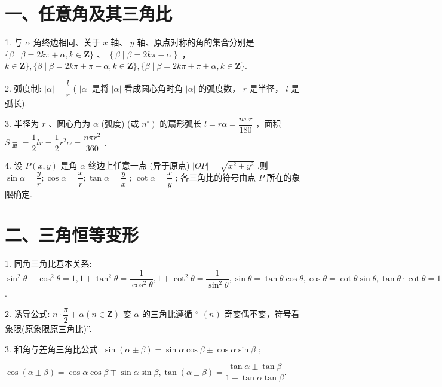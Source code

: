 \section*{一、任意角及其三角比}

1. 与 $\alpha$ 角终边相同、关于 $x$ 轴、 $y$ 轴、原点对称的角的集合分别是 $\{ \beta  \mid  \beta  = {2k\pi } + \alpha ,k \in  \mathbf{Z}\}$ 、 $\left\{  {\beta  \mid  \beta  = {2k\pi } - \alpha }\right\}$ ， $k \in  \mathbf{Z}\} ,\{ \beta  \mid  \beta  = {2k\pi } + \pi  - \alpha ,k \in  \mathbf{Z}\} ,\{ \beta  \mid  \beta  = {2k\pi } + \pi  + \alpha ,k \in  \mathbf{Z}\} .$

2. 弧度制: $\left| \alpha \right|  = \dfrac{l}{r}$ ( $\left| \alpha \right|$ 是将 $\left| \alpha \right|$ 看成圆心角时角 $\left| \alpha \right|$ 的弧度数， $r$ 是半径， $l$ 是弧长).

3. 半径为 $r$ 、圆心角为 $\alpha$ (弧度) (或 $\left. {n}^{ \circ  }\right)$ 的扇形弧长 $l = {r\alpha } = \dfrac{n\pi r}{180}$ ，面积 ${S}_{\text{ 扇 }} = \dfrac{1}{2}{lr} = \dfrac{1}{2}{r}^{2}\alpha  = \dfrac{{n\pi }{r}^{2}}{360}$ .

4. 设 $P\left( {x,y}\right)$ 是角 $\alpha$ 终边上任意一点 (异于原点) $\left| {OP}\right|  = \sqrt{{x}^{2} + {y}^{2}}$ ,则 $\sin \alpha  = \dfrac{y}{r};\cos \alpha  = \dfrac{x}{r};\tan \alpha  = \dfrac{y}{x}$ ; $\cot \alpha  = \dfrac{x}{y}$ ; 各三角比的符号由点 $P$ 所在的象限确定.

\section*{二、三角恒等变形}

1. 同角三角比基本关系: ${\sin }^{2}\theta  + {\cos }^{2}\theta  = 1,1 + {\tan }^{2}\theta  = \dfrac{1}{{\cos }^{2}\theta },1 + {\cot }^{2}\theta  = \dfrac{1}{{\sin }^{2}\theta },\sin \theta  = \tan \theta \cos \theta ,\cos \theta  =  \cot \theta \sin \theta ,\tan \theta  \cdot  \cot \theta  = 1$ .

2. 诱导公式: $n \cdot  \dfrac{\pi }{2} + \alpha \left( {n \in  \mathbf{Z}}\right)$ 变 $\alpha$ 的三角比遵循 “ $\left( n\right)$ 奇变偶不变，符号看象限(原象限原三角比)”.

3. 和角与差角三角比公式: $\sin \left( {\alpha  \pm  \beta }\right)  = \sin \alpha \cos \beta  \pm  \cos \alpha \sin \beta$ ;

$\cos \left( {\alpha  \pm  \beta }\right)  = \cos \alpha \cos \beta  \mp  \sin \alpha \sin \beta ,\tan \left( {\alpha  \pm  \beta }\right)  = \dfrac{\tan \alpha  \pm  \tan \beta }{1 \mp  \tan \alpha \tan \beta }.$

